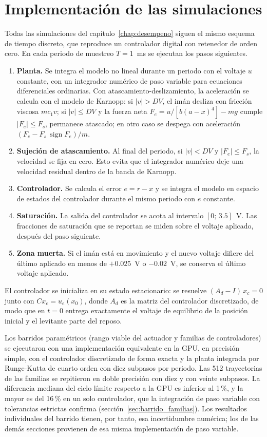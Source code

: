 \chapter{Implementación de las simulaciones}\label{ap:simulacion}

Todas las simulaciones del capítulo~\ref{chap:desempeno} siguen el mismo esquema de tiempo discreto, que reproduce un controlador digital con retenedor de orden cero. En cada periodo de muestreo $T=1$~ms se ejecutan los pasos siguientes.

\begin{enumerate}
  \item \textbf{Planta.} Se integra el modelo no lineal durante un periodo con el voltaje $u$ constante, con un integrador numérico de paso variable para ecuaciones diferenciales ordinarias. Con atascamiento-deslizamiento, la aceleración se calcula con el modelo de Karnopp: si $|v|>DV$, el imán desliza con fricción viscosa $m c_1 v$; si $|v|\le DV$ y la fuerza neta $F_e=u/[b(a-x)^4]-mg$ cumple $|F_e|\le F_s$, permanece atascado; en otro caso se despega con aceleración $(F_e - F_s\,\operatorname{sign}F_e)/m$.
  \item \textbf{Sujeción de atascamiento.} Al final del periodo, si $|v|<DV$ y $|F_e|\le F_s$, la velocidad se fija en cero. Esto evita que el integrador numérico deje una velocidad residual dentro de la banda de Karnopp.
  \item \textbf{Controlador.} Se calcula el error $e=r-x$ y se integra el modelo en espacio de estados del controlador durante el mismo periodo con $e$ constante.
  \item \textbf{Saturación.} La salida del controlador se acota al intervalo $[0;\,3.5]$~V. Las fracciones de saturación que se reportan se miden sobre el voltaje aplicado, después del paso siguiente.
  \item \textbf{Zona muerta.} Si el imán está en movimiento y el nuevo voltaje difiere del último aplicado en menos de $+0.025$~V o $-0.02$~V, se conserva el último voltaje aplicado.
\end{enumerate}

El controlador se inicializa en su estado estacionario: se resuelve $(A_d - I)\,x_c = 0$ junto con $C x_c = u_e(x_0)$, donde $A_d$ es la matriz del controlador discretizado, de modo que en $t=0$ entrega exactamente el voltaje de equilibrio de la posición inicial y el levitante parte del reposo.

Los barridos paramétricos (rango viable del actuador y familias de controladores) se ejecutaron con una implementación equivalente en la GPU, en precisión simple, con el controlador discretizado de forma exacta y la planta integrada por Runge-Kutta de cuarto orden con diez subpasos por periodo. Las 512 trayectorias de las familias se repitieron en doble precisión con diez y con veinte subpasos. La diferencia mediana del ciclo límite respecto a la GPU es inferior al 1\,\%, y la mayor es del 16\,\% en un solo controlador, que la integración de paso variable con tolerancias estrictas confirma (sección~\ref{sec:barrido_familias}). Los resultados individuales del barrido tienen, por tanto, esa incertidumbre numérica; los de las demás secciones provienen de esa misma implementación de paso variable.

